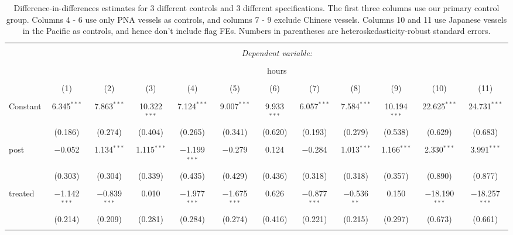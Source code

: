 \documentclass[11pt,english]{article}
\begin{document}
\clearpage
\begin{landscape}


\begin{table}[!htbp] \centering 
  \caption{\label{tab:did}Difference-in-differences estimates for 3 different controls and 3 different specifications. The first three columns use our primary control group. Columns 4 - 6 use only PNA vessels as controls, and columns 7 - 9 exclude Chinese vessels. Columns 10 and 11 use Japanese vessels in the Pacific as controls, and hence don't include flag FEs. Numbers in parentheses are heteroskedasticity-robust standard errors.} 
  \label{} 
\footnotesize 
\begin{tabular}{@{\extracolsep{1pt}}lccccccccccc} 
\\[-1.8ex]\hline 
\hline \\[-1.8ex] 
 & \multicolumn{11}{c}{\textit{Dependent variable:}} \\ 
\cline{2-12} 
\\[-1.8ex] & \multicolumn{11}{c}{hours} \\ 
\\[-1.8ex] & (1) & (2) & (3) & (4) & (5) & (6) & (7) & (8) & (9) & (10) & (11)\\ 
\hline \\[-1.8ex] 
 Constant & 6.345$^{***}$ & 7.863$^{***}$ & 10.322$^{***}$ & 7.124$^{***}$ & 9.007$^{***}$ & 9.933$^{***}$ & 6.057$^{***}$ & 7.584$^{***}$ & 10.194$^{***}$ & 22.625$^{***}$ & 24.731$^{***}$ \\ 
  & (0.186) & (0.274) & (0.404) & (0.265) & (0.341) & (0.620) & (0.193) & (0.279) & (0.538) & (0.629) & (0.683) \\ 
  & & & & & & & & & & & \\ 
 post & $-$0.052 & 1.134$^{***}$ & 1.115$^{***}$ & $-$1.199$^{***}$ & $-$0.279 & 0.124 & $-$0.284 & 1.013$^{***}$ & 1.166$^{***}$ & 2.330$^{***}$ & 3.991$^{***}$ \\ 
  & (0.303) & (0.304) & (0.339) & (0.435) & (0.429) & (0.436) & (0.318) & (0.318) & (0.357) & (0.890) & (0.877) \\ 
  & & & & & & & & & & & \\ 
 treated & $-$1.142$^{***}$ & $-$0.839$^{***}$ & 0.010 & $-$1.977$^{***}$ & $-$1.675$^{***}$ & 0.626 & $-$0.877$^{***}$ & $-$0.536$^{**}$ & 0.150 & $-$18.190$^{***}$ & $-$18.257$^{***}$ \\ 
  & (0.214) & (0.209) & (0.281) & (0.284) & (0.274) & (0.416) & (0.221) & (0.215) & (0.297) & (0.673) & (0.661) \\ 
  & & & & & & & & & & & \\ 

\end{tabular}
\end{table}
\end{landscape}
\end{document}
